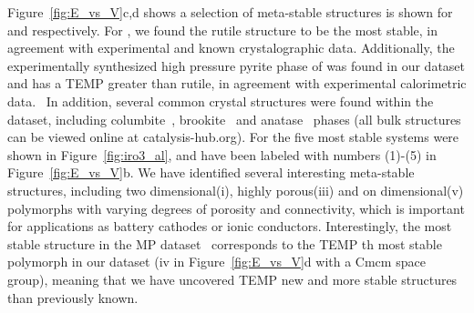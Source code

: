 Figure~\ref{fig:E_vs_V}c,d shows a selection of meta-stable structures is shown for \IrOtwo and \IrOthree respectively.
%
For \IrOtwo, we found the rutile structure to be the most stable,
in agreement with experimental and known crystalographic data.
%
Additionally, the experimentally synthesized high pressure pyrite phase of \IrOtwo was found in our dataset and has a \DHf TEMP greater than rutile, in agreement with experimental calorimetric data.~\cite{bolzan1997structural, shirako2014synthesis}
%
%
In addition, several common \ABtwo crystal structures were found within the dataset, including columbite~\cite{columbite}, brookite~\cite{brookite} and anatase~\cite{anatase} phases
(all bulk structures can be viewed online at catalysis-hub.org).
%
For \IrOthree the five most stable systems were shown in Figure~\ref{fig:iro3_al}, and have been labeled with numbers (1)-(5) in Figure~\ref{fig:E_vs_V}b.
%
We have identified several interesting meta-stable structures, including two dimensional(i), highly porous(iii) and on dimensional(v) polymorphs with varying degrees of porosity and connectivity,
which is important for applications as battery cathodes or ionic conductors.\cite{}
%
%
Interestingly, the most stable \IrOthree structure in the MP dataset~\cite{mp-1097041} corresponds to the TEMP th most stable \IrOthree polymorph in our dataset
(iv in Figure~\ref{fig:E_vs_V}d with a Cmcm space group),
meaning that we have uncovered TEMP new and more stable \IrOthree structures than previously known.
